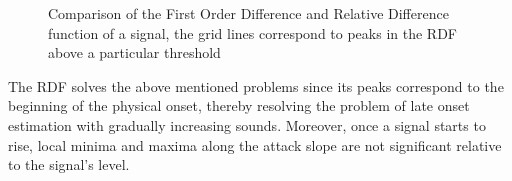 \begin{figure}[thp]
  \begin{center}
    \label{Comparison of First Order Difference and Relative
      Difference Functions}
    \caption{Comparison of the First Order Difference and Relative
      Difference function of a signal, the grid lines correspond to
      peaks in the RDF above a particular threshold}
  \end{center}
\end{figure}

The RDF solves the above mentioned problems since its peaks 
correspond to the beginning of the physical onset, thereby
resolving the problem of late onset estimation with gradually
increasing sounds. Moreover, once a signal starts to rise, local
minima and maxima along the attack slope are not significant relative
to the signal's level.

